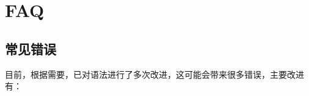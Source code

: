 \documentclass[../main.tex]{subfiles}
\begin{document}
\section{FAQ}

\subsection{常见错误}

目前，根据需要，已对语法进行了多次改进，这可能会带来很多错误，主要改进有：
\end{document}
